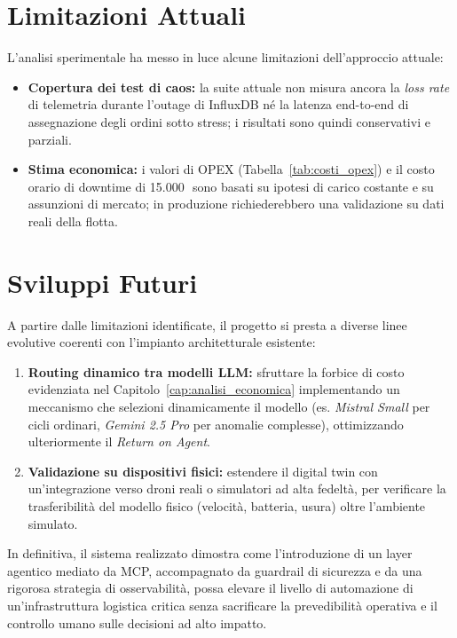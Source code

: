 \section{Limitazioni Attuali}
\label{sec:limitazioni}

L'analisi sperimentale ha messo in luce alcune limitazioni dell'approccio attuale:

\begin{itemize}
    \item \textbf{Copertura dei test di caos:} la suite attuale non misura ancora la \textit{loss rate} di telemetria durante l'outage di InfluxDB né la latenza end-to-end di assegnazione degli ordini sotto stress; i risultati sono quindi conservativi e parziali.
    \item \textbf{Stima economica:} i valori di OPEX (Tabella~\ref{tab:costi_opex}) e il costo orario di downtime di 15.000\,\texteuro\ sono basati su ipotesi di carico costante e su assunzioni di mercato; in produzione richiederebbero una validazione su dati reali della flotta.
\end{itemize}

\section{Sviluppi Futuri}
\label{sec:sviluppi_futuri}

A partire dalle limitazioni identificate, il progetto si presta a diverse linee evolutive coerenti con l'impianto architetturale esistente:

\begin{enumerate}
    \item \textbf{Routing dinamico tra modelli LLM:} sfruttare la forbice di costo evidenziata nel Capitolo~\ref{cap:analisi_economica} implementando un meccanismo che selezioni dinamicamente il modello (es. \textit{Mistral Small} per cicli ordinari, \textit{Gemini 2.5 Pro} per anomalie complesse), ottimizzando ulteriormente il \textit{Return on Agent}.
    \item \textbf{Validazione su dispositivi fisici:} estendere il digital twin con un'integrazione verso droni reali o simulatori ad alta fedeltà, per verificare la trasferibilità del modello fisico (velocità, batteria, usura) oltre l'ambiente simulato.
\end{enumerate}

In definitiva, il sistema realizzato dimostra come l'introduzione di un layer agentico mediato da MCP, accompagnato da guardrail di sicurezza e da una rigorosa strategia di osservabilità, possa elevare il livello di automazione di un'infrastruttura logistica critica senza sacrificare la prevedibilità operativa e il controllo umano sulle decisioni ad alto impatto.
